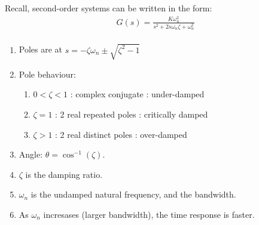 \begin{enumerate}
\begin{enumerate}
                Recall, second-order systems can be written in the form:
                \begin{align*}
                    G(s) = \frac{K \omega_n^2}{s^2 + 2s\omega_n \zeta + \omega_n^2} \\
                \end{align*}
                \begin{enumerate}
                    \item Poles are at $s = -\zeta \omega_n \pm \sqrt{\zeta^2 - 1}$
                    \item Pole behaviour:
                    \begin{enumerate}
                        \item $0 < \zeta < 1$ : complex conjugate : under-damped
                        \item $\zeta = 1$ : 2 real repeated poles : critically damped
                        \item $\zeta > 1$ : 2 real distinct poles : over-damped
                    \end{enumerate}
                    \item Angle: $\theta = \cos^{-1}(\zeta)$.
                    \item $\zeta$ is the damping ratio.
                    \item $\omega_n$ is the undamped natural frequency, and the bandwidth.
                    \item As $\omega_n$ incresases (larger bandwidth), the time response is faster.
                \end{enumerate}


\end{enumerate}
\end{enumerate}
